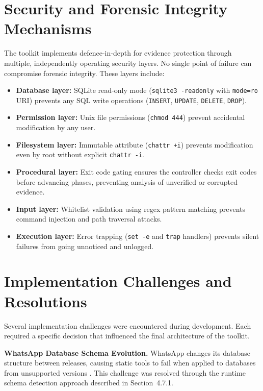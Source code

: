\documentclass[12pt,a4paper]{report}
\begin{document}
\section{Security and Forensic Integrity Mechanisms}

The toolkit implements defence-in-depth for evidence protection through multiple, independently operating security layers. No single point of failure can compromise forensic integrity. These layers include:

\begin{itemize}
    \item \textbf{Database layer:} SQLite read-only mode (\texttt{sqlite3 -readonly} with \texttt{mode=ro} URI) prevents any SQL write operations (\texttt{INSERT}, \texttt{UPDATE}, \texttt{DELETE}, \texttt{DROP}).
    \item \textbf{Permission layer:} Unix file permissions (\texttt{chmod 444}) prevent accidental modification by any user.
    \item \textbf{Filesystem layer:} Immutable attribute (\texttt{chattr +i}) prevents modification even by root without explicit \texttt{chattr -i}.
    \item \textbf{Procedural layer:} Exit code gating ensures the controller checks exit codes before advancing phases, preventing analysis of unverified or corrupted evidence.
    \item \textbf{Input layer:} Whitelist validation using regex pattern matching prevents command injection and path traversal attacks.
    \item \textbf{Execution layer:} Error trapping (\texttt{set -e} and \texttt{trap} handlers) prevents silent failures from going unnoticed and unlogged.
\end{itemize}

\section{Implementation Challenges and Resolutions}

Several implementation challenges were encountered during development. Each required a specific decision that influenced the final architecture of the toolkit.

\textbf{WhatsApp Database Schema Evolution.} WhatsApp changes its database structure between releases, causing static tools to fail when applied to databases from unsupported versions \citep{anglano2014,fayyad2022}. This challenge was resolved through the runtime schema detection approach described in Section~4.7.1.
\end{document}
